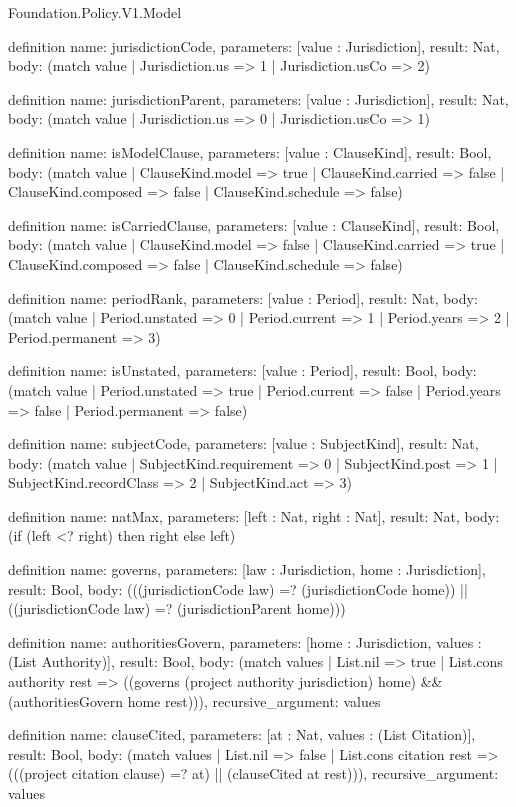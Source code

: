 \begin{lexlean}{Foundation.Policy.V1.Model}
\begin{semanticmodule}
definition{
  name: jurisdictionCode,
  parameters: [value : Jurisdiction],
  result: Nat,
  body: (match value | Jurisdiction.us => 1 | Jurisdiction.usCo => 2)
}

definition{
  name: jurisdictionParent,
  parameters: [value : Jurisdiction],
  result: Nat,
  body: (match value | Jurisdiction.us => 0 | Jurisdiction.usCo => 1)
}

definition{
  name: isModelClause,
  parameters: [value : ClauseKind],
  result: Bool,
  body: (match value
    | ClauseKind.model => true
    | ClauseKind.carried => false
    | ClauseKind.composed => false
    | ClauseKind.schedule => false)
}

definition{
  name: isCarriedClause,
  parameters: [value : ClauseKind],
  result: Bool,
  body: (match value
    | ClauseKind.model => false
    | ClauseKind.carried => true
    | ClauseKind.composed => false
    | ClauseKind.schedule => false)
}

definition{
  name: periodRank,
  parameters: [value : Period],
  result: Nat,
  body: (match value
    | Period.unstated => 0
    | Period.current => 1
    | Period.years => 2
    | Period.permanent => 3)
}

definition{
  name: isUnstated,
  parameters: [value : Period],
  result: Bool,
  body: (match value
    | Period.unstated => true
    | Period.current => false
    | Period.years => false
    | Period.permanent => false)
}

definition{
  name: subjectCode,
  parameters: [value : SubjectKind],
  result: Nat,
  body: (match value
    | SubjectKind.requirement => 0
    | SubjectKind.post => 1
    | SubjectKind.recordClass => 2
    | SubjectKind.act => 3)
}

definition{
  name: natMax,
  parameters: [left : Nat, right : Nat],
  result: Nat,
  body: (if (left <? right) then right else left)
}

definition{
  name: governs,
  parameters: [law : Jurisdiction, home : Jurisdiction],
  result: Bool,
  body: (((jurisdictionCode law) =? (jurisdictionCode home)) || ((jurisdictionCode law) =? (jurisdictionParent home)))
}

definition{
  name: authoritiesGovern,
  parameters: [home : Jurisdiction, values : (List Authority)],
  result: Bool,
  body: (match values
    | List.nil => true
    | List.cons authority rest => ((governs (project authority jurisdiction) home) && (authoritiesGovern home rest))),
  recursive_argument: values
}

definition{
  name: clauseCited,
  parameters: [at : Nat, values : (List Citation)],
  result: Bool,
  body: (match values
    | List.nil => false
    | List.cons citation rest => (((project citation clause) =? at) || (clauseCited at rest))),
  recursive_argument: values
}


\end{semanticmodule}
\end{lexlean}
